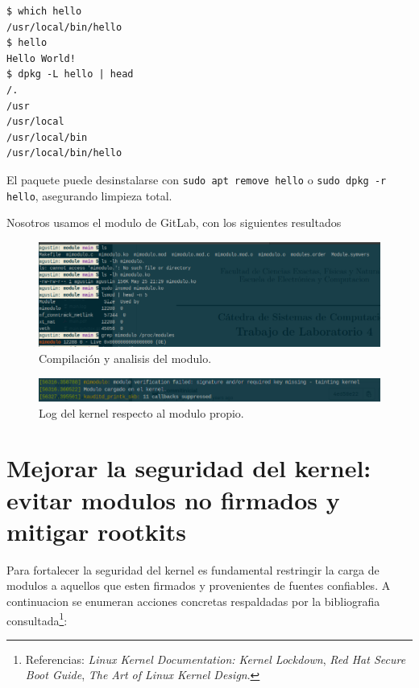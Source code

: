 \begin{lstlisting}
$ which hello
/usr/local/bin/hello
$ hello
Hello World!
$ dpkg -L hello | head
/.
/usr
/usr/local
/usr/local/bin
/usr/local/bin/hello
\end{lstlisting}

El paquete puede desinstalarse con \texttt{sudo apt remove hello} o \texttt{sudo dpkg -r hello}, asegurando limpieza total.

Nosotros usamos el modulo de GitLab, con los siguientes resultados

\begin{figure}[h!]
  \centering
  \includegraphics[width=0.8\linewidth]{images/paso1.png}
  \caption{Compilación y analisis del modulo.}
\end{figure}


\begin{figure}[h!]
  \centering
  \includegraphics[width=0.8\linewidth]{images/kernellog.png}
  \caption{Log del kernel respecto al modulo propio.}
\end{figure}

\newpage

\section{Mejorar la seguridad del kernel: evitar modulos no firmados y mitigar rootkits}

Para fortalecer la seguridad del kernel es fundamental restringir la carga de modulos a aquellos que esten firmados y provenientes de fuentes confiables. A continuacion se enumeran acciones concretas respaldadas por la bibliografia consultada\footnote{Referencias: \emph{Linux Kernel Documentation: Kernel Lockdown}, \emph{Red Hat Secure Boot Guide}, \emph{The Art of Linux Kernel Design}.}:

